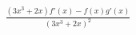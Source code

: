\documentclass[preview]{standalone}
\begin{document}
\begin{align*}
\frac{(3x^3+2x)f'(x)-f(x)g'(x)}{(3x^3+2x)^2}
\end{align*}
\end{document}
